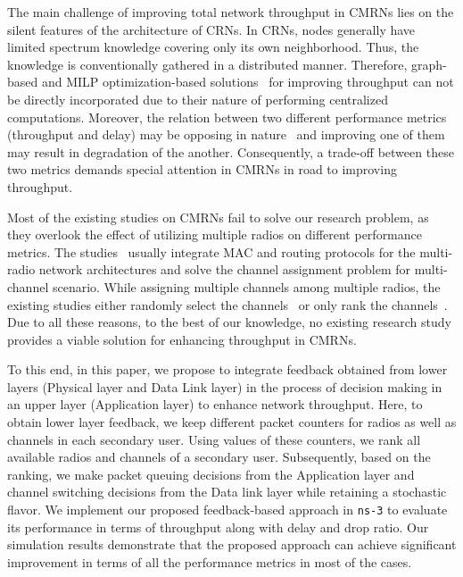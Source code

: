 \documentclass[letterpaper,conference]{IEEEtran}
\begin{document}
The main challenge of improving total network throughput in CMRNs lies on the silent features of the architecture of CRNs. In CRNs, nodes generally have limited spectrum knowledge covering only its own neighborhood. Thus, the knowledge is conventionally gathered in a distributed manner. Therefore, graph-based and MILP optimization-based solutions~\cite{hoang2008downlink,ahmed2014channel} for improving throughput can not be directly incorporated due to their nature of performing centralized computations. Moreover, the relation between two different performance metrics (throughput and delay) may be opposing in nature~\cite{gamal2004throughput} and improving one of them may result in degradation of the another. Consequently, a trade-off between these two metrics demands special attention in CMRNs in road to improving throughput.

Most of the existing studies on CMRNs fail to solve our research problem, as they overlook the effect of utilizing multiple radios on different performance metrics. The studies~\cite{de2012survey, feng2009joint, zhong2014capacity, li2014deterministic} usually integrate MAC and routing protocols for the multi-radio network architectures and solve the channel assignment problem for multi-channel scenario. While assigning multiple channels among multiple radios, the existing studies either randomly select the channels~\cite{khan2015towards} or only rank the channels~\cite{zhong2014capacity}. Due to all these reasons, to the best of our knowledge, no existing research study provides a viable solution for enhancing throughput in CMRNs.

To this end, in this paper, we propose to integrate feedback obtained from lower layers (Physical layer and Data Link layer) in the process of decision making in an upper layer (Application layer) to enhance network throughput. Here, to obtain lower layer feedback, we keep different packet counters for radios as well as channels in each secondary user. Using values of these counters, we rank all available radios and channels of a secondary user. Subsequently, based on the ranking, we make packet queuing decisions from the Application layer and channel switching decisions from the Data link layer while retaining a stochastic flavor. We implement our proposed feedback-based approach in \texttt{ns-3} to evaluate its performance in terms of throughput along with delay and drop ratio. Our simulation results demonstrate that the proposed approach can achieve significant improvement in terms of all the performance metrics in most of the cases.
\end{document}
